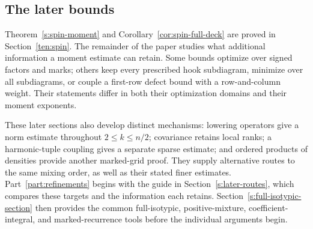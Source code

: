 \subsection*{The later bounds}
Theorem~\ref{s:spin-moment} and Corollary~\ref{cor:spin-full-deck} are
proved in Section~\ref{ten:spin}. The remainder of the paper studies
what additional information a moment estimate can retain. Some bounds
optimize over signed factors and marks; others keep every prescribed
hook subdiagram, minimize over all subdiagrams, or couple a first-row
defect bound with a row-and-column weight. Their statements differ in
both their optimization domains and their moment exponents.

These later sections also develop distinct mechanisms: lowering
operators give a norm estimate throughout $2\le k\le n/2$;
covariance retains local ranks; a harmonic-tuple coupling gives a
separate sparse estimate; and ordered products of densities provide
another marked-grid proof. They supply alternative routes to the same
mixing order, as well as their stated finer estimates.
Part~\ref{part:refinements} begins with the guide in Section~\ref{s:later-routes}, which
compares these targets and the information each retains.
Section~\ref{s:full-isotypic-section} then provides the common
full-isotypic, positive-mixture, coefficient-integral, and
marked-recurrence tools before the individual arguments begin.
